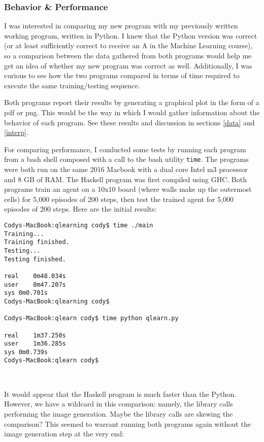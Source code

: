 \documentclass[12pt,a4paper]{article}
\begin{document}
			\subsubsection{Behavior \& Performance}
			
			\par I was interested in comparing my new program with my previously written working program, written in Python. I knew that the Python version was correct (or at least sufficiently correct to receive an A in the Machine Learning course), so a comparison between the data gathered from both programs would help me get an idea of whether my new program was correct as well. Additionally, I was curious to see how the two programs compared in terms of time required to execute the same training/testing sequence.
			\par Both programs report their results by generating a graphical plot in the form of a pdf or png. This would be the way in which I would gather information about the behavior of each program. See these results and discussion in sections \ref{data} and \ref{interp}.
			\par For comparing performance, I conducted some tests by running each program from a bash shell composed with a call to the bash utility \texttt{time}. The programs were both run on the same 2016 Macbook with a dual core Intel m3 processor and 8 GB of RAM. The Haskell program was first compiled using GHC. Both programs train an agent on a 10x10 board (where walls make up the outermost cells) for 5,000 episodes of 200 steps, then test the trained agent for 5,000 episodes of 200 steps. Here are the initial results:\\
			
			\begin{lstlisting}[numbers=none]
Codys-MacBook:qlearning cody$ time ./main
Training...
Training finished.
Testing...
Testing finished.

real	0m48.034s
user	0m47.207s
sys	0m0.701s
Codys-MacBook:qlearning cody$

Codys-MacBook:qlearn cody$ time python qlearn.py

real	1m37.250s
user	1m36.285s
sys	0m0.739s
Codys-MacBook:qlearn cody$
			\end{lstlisting}\ \\
			
			\par It would appear that the Haskell program is much faster than the Python. However, we have a wildcard in this comparison: namely, the library calls performing the image generation. Maybe the library calls are skewing the comparison? This seemed to warrant running both programs again without the image generation step at the very end:\\
			
\end{document}
